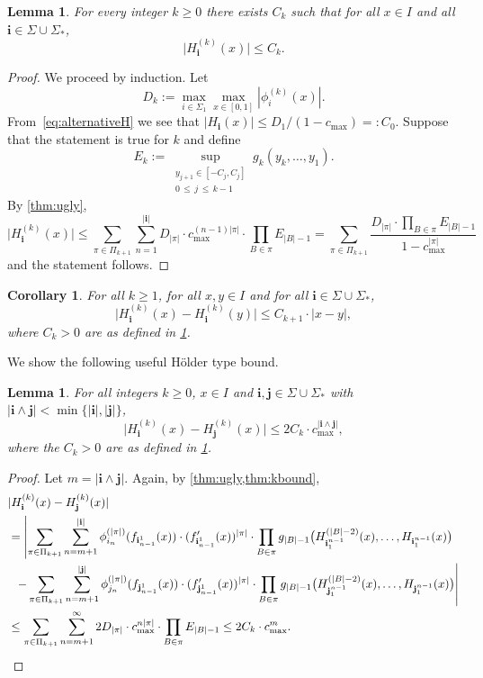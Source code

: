 \documentclass[11pt,]{article}
\def\cref#1{\ref{#1}}%
\newtheorem{corollary}[theorem]{Corollary}
\newtheorem{lemma}[theorem]{Lemma}
\theoremstyle{definition}
\theoremstyle{remark}
\newcommand{\0}{\mathbf{0}}
\newcommand{\bi}{\mathbf{i}}
\newcommand{\bj}{\mathbf{j}}
\numberwithin{equation}{section}
\begin{document}
\begin{lemma}\label{thm:kbound}
For every integer $k\geq 0$ there exists $C_k$ such that for all $x\in I$ and all
$\bi\in\Sigma\cup\Sigma_*$,
\[
\big|H_{\bi}^{(k)}(x)\big|\leq C_k.
\]
\end{lemma}
\begin{proof}
We proceed by induction. Let
\[
D_k:=\max_{i\in\Sigma_1}\max_{x\in[0,1]} |\phi_i^{(k)}(x)|.
\]
From~\cref{eq:alternativeH} we see that
$|H_{\bi}(x)| \leq D_1/(1-c_{\max})=:C_0$.
Suppose that the statement is true for $k$ and define
\begin{equation}\label{eq:E_k}
E_k:= \sup_{\substack{y_{j+1}\in[-C_j,C_j]\\0\,\leq\, j \,\leq\, k-1}}g_k(y_k,\dots,y_1).
\end{equation}
By \cref{thm:ugly},
\[
\big|H_{\bi}^{(k)}(x)\big| \leq \sum_{\pi\in\Pi_{k+1}}\sum_{n=1}^{|\bi|} D_{|\pi|} \cdot
c_{\max}^{(n-1)|\pi|} \cdot \prod_{B\in\pi}
E_{|B|-1}
= \sum_{\pi\in\Pi_{k+1}} \frac{D_{|\pi|}\cdot \prod_{B\in\pi}E_{|B|-1}}{1-c_{\max}^{|\pi|}}
\]
and the statement follows.
\end{proof}
\begin{corollary}
\label{thm:difcor}
For all $k\geq 1$, for all $x,y\in I$ and for all $\bi\in\Sigma\cup\Sigma_*$,
\[
\big|H_{\bi}^{(k)}(x) - H_{\bi}^{(k)}(y)\big| \leq C_{k+1}\cdot |x-y|,
\]
where $C_k>0$ are as defined in \cref{thm:kbound}. 
\end{corollary}
We show the following useful H\"older type bound. 
\begin{lemma}\label{thm:difbound}
For all integers $k\geq 0$, $x\in I$ and $\bi,\bj\in\Sigma\cup\Sigma_*$ with
$|\bi\wedge\bj|<\min\{|\bi|,|\bj|\}$,
\[
\big|H_{\bi}^{(k)}(x) - H_{\bj}^{(k)}(x)\big| \leq 2C_k\cdot c_{\max}^{|\bi\wedge\bj|},
\]
where the $C_k>0$ are as defined in \cref{thm:kbound}. 
\end{lemma}
\begin{proof}
  Let $m = |\bi\wedge\bj|$. Again, by \cref{thm:ugly,thm:kbound},
  \begin{align*}
	&|H_{\bi}^{(k)}(x) - H_{\bj}^{(k)}(x)|
	\\
	&=
	\left|
	\sum_{\pi\in\Pi_{k+1}} \sum_{n=m+1}^{|\bi|} \phi_{i_n}^{(|\pi|)}(f_{\bi_{n-1}^1}(x))\cdot 
	(f'_{\bi_{n-1}^1}(x))^{|\pi|} \cdot
	\prod_{B\in\pi} g_{|B|-1}\big(H_{\bi_1^{n-1}}^{(|B|-2)}(x),\dots,H_{\bi_1^{n-1}}(x)\big)
      \right.
      \\
	&
	\left.\;\; -
	  \sum_{\pi\in\Pi_{k+1}} \sum_{n=m+1}^{|\bj|} \phi_{j_n}^{(|\pi|)}(f_{\bj_{n-1}^1}(x))\cdot
	  (f'_{\bj_{n-1}^1}(x))^{|\pi|} \cdot
	  \prod_{B\in\pi} g_{|B|-1}\big(H_{\bj_1^{n-1}}^{(|B|-2)}(x),\dots,H_{\bj_1^{n-1}}(x)\big)
	  \right|\\
	&\leq
	\sum_{\pi\in\Pi_{k+1}}\sum_{n=m+1}^\infty 2D_{|\pi|}\cdot c_{\max}^{n|\pi|} \cdot
	\prod_{B\in\pi} E_{|B|-1}
	\leq 2 C_{k}\cdot c_{\max}^m.
	\qedhere
  \end{align*}
\end{proof}
\end{document}
